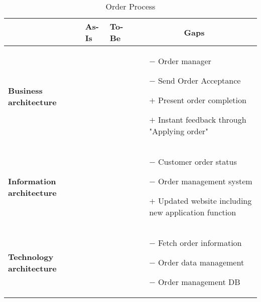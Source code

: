 \begin{table}[H]
	\centering
	\begin{tabular}{|p{2.4cm}|l|l|p{7.5cm}|}
		\hline
		\textbf{} & \textbf{As-Is} & \textbf{To-Be} & \multicolumn{1}{c|}{\textbf{Gaps}} \\ \hline
		\textbf{Business architecture} &  &  & \begin{itemize}\vspace{-0.5cm}
		\item[$-$] Order manager
		\item[$-$] Send Order Acceptance
		\item[$+$] Present order completion
		\item[$+$] Instant feedback through "Applying order"
		\end{itemize}\vspace{-0.7cm} \\ \hline 

		\textbf{Information architecture} &  &  & \begin{itemize}\vspace{-0.5cm}
		\item[$-$] Customer order status
		\item[$-$] Order management system
		\item[$+$] Updated website including new application function
		\end{itemize}\vspace{-0.7cm} \\ \hline

		\textbf{Technology architecture} &  &  & \begin{itemize}\vspace{-0.5cm}
		\item[$-$] Fetch order information
		\item[$-$] Order data management
		\item[$-$] Order management DB
		\end{itemize}\vspace{-0.7cm} \\ \hline
	\end{tabular}	
	\caption{Order Process}
	\label{table:gaps_order}
\end{table}

